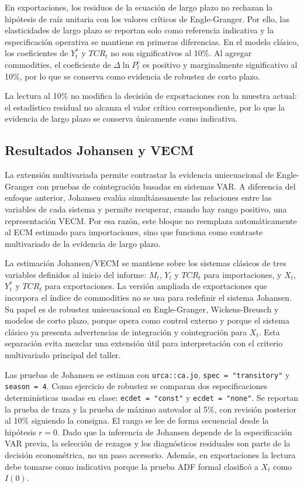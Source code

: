 \documentclass[11pt,a4paper]{article}
\begin{document}
	En exportaciones, los residuos de la ecuación de largo plazo no rechazan la
	hipótesis de raíz unitaria con los valores críticos de Engle-Granger. Por ello,
	las elasticidades de largo plazo se reportan solo como referencia indicativa y
	la especificación operativa se mantiene en primeras diferencias. En el modelo
	clásico, los coeficientes de \(Y_t^*\) y \(TCR_t\) no son significativos al
	10\%. Al agregar commodities, el coeficiente de \(\Delta \ln P_t^c\) es
	positivo y marginalmente significativo al 10\%, por lo que se conserva como
	evidencia de robustez de corto plazo.

	La lectura al 10\% no modifica la decisión de exportaciones con la muestra
	actual: el estadístico residual no alcanza el valor crítico correspondiente, por
	lo que la evidencia de largo plazo se conserva únicamente como indicativa.

	\subsection{Resultados Johansen y VECM}
	\label{subsec:resultados-johansen-vec}

	La extensión multivariada permite contrastar la evidencia uniecuacional de
	Engle-Granger con pruebas de cointegración basadas en sistemas VAR. A diferencia
	del enfoque anterior, Johansen evalúa simultáneamente las relaciones entre las
	variables de cada sistema y permite recuperar, cuando hay rango positivo, una
	representación VECM. Por esa razón, este bloque no reemplaza automáticamente al
	ECM estimado para importaciones, sino que funciona como contraste multivariado
	de la evidencia de largo plazo.

	La estimación Johansen/VECM se mantiene sobre los sistemas clásicos de tres
	variables definidos al inicio del informe: \(M_t\), \(Y_t\) y \(TCR_t\) para
	importaciones, y \(X_t\), \(Y_t^*\) y \(TCR_t\) para exportaciones. La versión
	ampliada de exportaciones que incorpora el índice de commodities no se usa para
	redefinir el sistema Johansen. Su papel es de robustez uniecuacional en
	Engle-Granger, Wickens-Breusch y modelos de corto plazo, porque opera como
	control externo y porque el sistema clásico ya presenta advertencias de
	integración y cointegración para \(X_t\). Esta separación evita mezclar una
	extensión útil para interpretación con el criterio multivariado principal del
	taller.

	Las pruebas de Johansen se estiman con \texttt{urca::ca.jo},
	\texttt{spec = "transitory"} y \texttt{season = 4}. Como ejercicio de robustez
	se comparan dos especificaciones determinísticas usadas en clase:
	\texttt{ecdet = "const"} y \texttt{ecdet = "none"}. Se reportan la prueba de
	traza y la prueba de máximo autovalor al 5\%, con revisión posterior al 10\%
	siguiendo la consigna. El rango se lee de forma secuencial desde la hipótesis
	\(r=0\). Dado que la inferencia de Johansen depende de la especificación VAR
	previa, la selección de rezagos y los diagnósticos residuales son parte de la
	decisión econométrica, no un paso accesorio. Además, en exportaciones la lectura
	debe tomarse como indicativa porque la prueba ADF formal clasificó a \(X_t\)
	como \(I(0)\).
\end{document}
